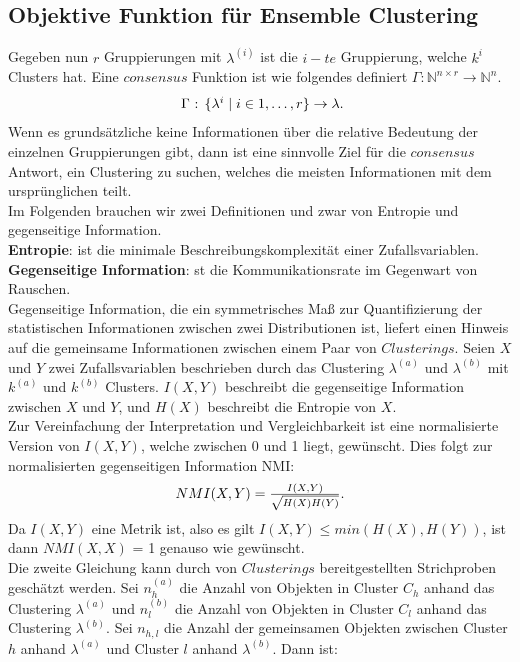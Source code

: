 \documentclass[runningheads]{llncs}
\begin{document}
\subsection{Objektive Funktion für Ensemble Clustering}
Gegeben nun $r$ Gruppierungen mit $\lambda^{(i)}$ ist die $i-te$ Gruppierung, welche $k^{i}$ Clusters hat. Eine $consensus$ Funktion ist wie folgendes definiert $\Gamma:\mathbb{N}^{n \times r} \rightarrow \mathbb{N}^{n}$.
\begin{equation} 
\centerline{ $\Gamma$ : $\{\lambda^{i} \mid i \in {1, \ldots, r}\} \rightarrow \lambda$.}
\end{equation}
Wenn es grundsätzliche keine Informationen über die relative Bedeutung der einzelnen Gruppierungen gibt, dann ist eine sinnvolle Ziel für die $consensus$ Antwort, ein Clustering zu suchen, welches die meisten Informationen mit dem ursprünglichen  teilt.  \\
Im Folgenden brauchen wir zwei Definitionen und zwar von Entropie und gegenseitige Information.\\
\textbf{Entropie}: ist die minimale Beschreibungskomplexität einer Zufallsvariablen.\\
\textbf{Gegenseitige Information}: st die Kommunikationsrate im Gegenwart von Rauschen.\\
Gegenseitige Information, die ein symmetrisches Maß zur Quantifizierung der statistischen Informationen zwischen zwei Distributionen ist, liefert einen Hinweis auf die gemeinsame Informationen zwischen einem Paar von $Clusterings$. Seien $X$ und $Y$ zwei Zufallsvariablen beschrieben durch das Clustering $\lambda^{(a)}$ und $\lambda^{(b)}$ mit $k^{(a)}$ und $k^{(b)}$ Clusters. $I(X,Y)$ beschreibt die gegenseitige Information zwischen $X$ und $Y$, und $H(X)$ beschreibt die Entropie von $X$.\\
Zur Vereinfachung der Interpretation und Vergleichbarkeit ist eine normalisierte Version von $I(X,Y)$, welche zwischen 0 und 1 liegt, gewünscht. Dies folgt zur normalisierten gegenseitigen Information NMI:
\begin{equation} 
\centerline{$NMI(X,Y) = \frac{I(X,Y)}{\sqrt{H(X)H(Y)}}.$}
\end{equation}
Da $I(X,Y)$ eine Metrik ist, also es gilt $I(X,Y) \leq min(H(X), H(Y))$, ist dann $NMI(X,X)$ = 1 genauso wie gewünscht.\\
Die zweite Gleichung kann durch von $Clusterings$ bereitgestellten Strichproben geschätzt werden. Sei $n_{h}^{(a)}$ die Anzahl von Objekten in Cluster $C_{h}$ anhand das Clustering $\lambda^{(a)}$ und $n_{l}^{(b)}$ die Anzahl von Objekten in Cluster $C_{l}$ anhand das Clustering $\lambda^{(b)}$. Sei $n_{h,l}$ die Anzahl der gemeinsamen Objekten zwischen Cluster $h$ anhand $\lambda^{(a)}$ und Cluster $l$ anhand $\lambda^{(b)}$. Dann ist:
\end{document}
